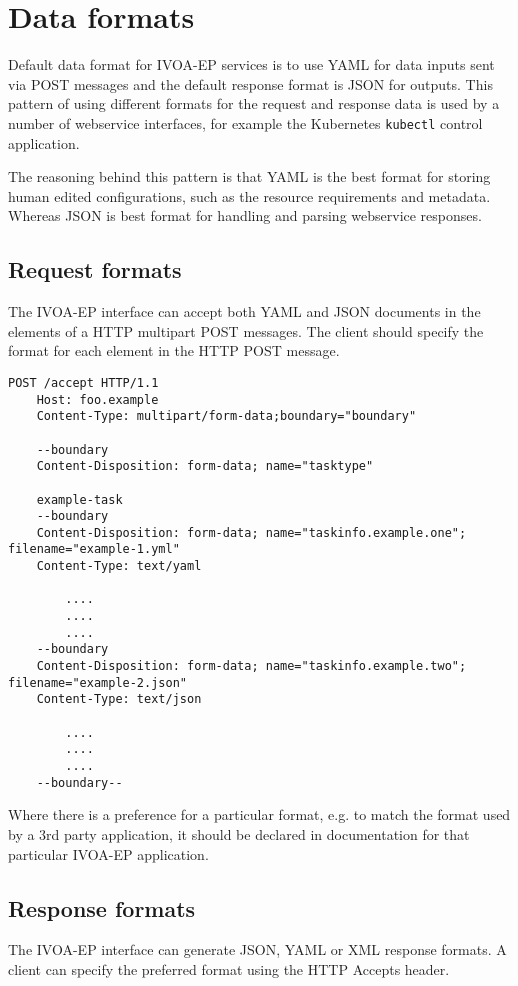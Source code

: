 \documentclass[11pt,a4paper]{ivoa}
\newcommand{\xml} {XML\xspace}
\newcommand{\json} {JSON\xspace}
\newcommand{\yaml} {YAML\xspace}
\newcommand{\webservice} {webservice\xspace}
\newcommand{\ivoep} {IVOA-EP\xspace}
\newcommand{\codeword}[1] {\texttt{#1}}
\begin{document}
\section{Data formats}
\label{sec:data-formats}
Default data format for \ivoep services is to use 
\yaml for data inputs sent via POST messages and the default response format is \json for outputs.
This pattern of using different formats for the request and response data is used by a number of \webservice interfaces, for example the Kubernetes \codeword{kubectl} control application.

The reasoning behind this pattern is that \yaml is the best format for storing human edited configurations, such as the resource requirements and metadata. Whereas \json is best format for handling and parsing \webservice responses. 

\subsection{Request formats}
\label{sec:request-formats}
The \ivoep interface can accept both YAML and JSON documents in the elements of a HTTP multipart POST messages. The client should specify the format for each element in the HTTP POST message.
\begin{lstlisting}[]
    POST /accept HTTP/1.1
    Host: foo.example
    Content-Type: multipart/form-data;boundary="boundary"

    --boundary
    Content-Disposition: form-data; name="tasktype"

    example-task
    --boundary
    Content-Disposition: form-data; name="taskinfo.example.one"; filename="example-1.yml"
    Content-Type: text/yaml

        ....
        ....
        ....
    --boundary
    Content-Disposition: form-data; name="taskinfo.example.two"; filename="example-2.json"
    Content-Type: text/json

        ....
        ....
        ....
    --boundary--
\end{lstlisting}

Where there is a preference for a particular format, e.g. to match the format used by a 3rd party application, it should be declared in documentation for that particular \ivoep application.

\subsection{Response formats}
\label{sec:response-formats}
The \ivoep interface can generate \json, \yaml or \xml response formats.
A client can specify the preferred format using the HTTP Accepts header.
 


\end{document}
